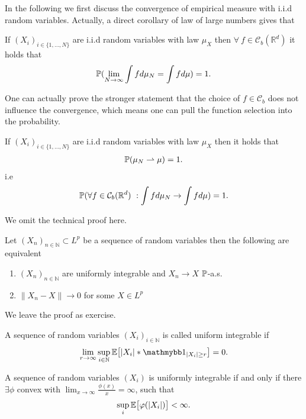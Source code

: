 In the following we first discuss the convergence of empirical measure with i.i.d random variables. 
Actually, a direct corollary of law of large numbers gives that
\begin{prop}
	If  $(X_i)_{i \in  \{1,\ldots ,N\}  }$ are i.i.d random variables with law $\mu_{X}$ then  $\forall  \ f \in  \mathcal{C}_b(\mathbb{R}^{d} ) $ it holds that
	\begin{align*}
	\P(\lim_{N \to \infty} \int  f d \mu_N = \int f d\mu ) = 1
	.\end{align*}
\end{prop}
One can actually prove the stronger statement that the choice of $f \in  \mathcal{C}_b$ does not influence the convergence, which means one can pull the function selection into the probability.
\begin{prop}
	If  $(X_i)_{i \in  \{1,\ldots ,N\}  }$ are i.i.d random variables with law $\mu_{X}$ then  it holds that
	\begin{align*}
	\P(\mu_N \rightharpoonup \mu ) = 1
	.\end{align*}
	i.e 
	\begin{align*}
	\P( \forall  f \in  \mathcal{C}_b(\mathbb{R}^{d} ) \ : \int f d\mu_N \to  \int  f d\mu )  = 1
	.\end{align*}
\end{prop}
We omit the technical proof here.
\newpage
\begin{lemma}\label{general_dct}
	Let $(X_n)_{n \in  \mathbb{N}} \subset   L^{p} $ be a sequence of random variables then the following are equivalent 
	\begin{enumerate}
		\item $(X_n)_{n \in  \mathbb{N}}$ are uniformly integrable  and $X_n \to X$ $\P$-a.s.
		\item $\|X_n - X\| \to  0$ for some $X \in  L^p$
	\end{enumerate}
\end{lemma}
We leave the proof as exercise.
\begin{definition}
A sequence of random variables $(X_i)_{i \in  \mathbb{N}}$ is called uniform integrable if
	\begin{align*}
	\lim_{r \to  \infty} \sup_{i \in  \mathbb{N}} \E\big[\abs{X_i}*\cha_{\abs{X_i}\ge r}\big] = 0
	.\end{align*}
\end{definition}
\begin{lemma}\label{de_la_valle}
	A sequence of random variables $(X_i)$  is uniformly integrable if and only if there 
	$\exists \phi $ convex with
$\lim_{x \to \infty} \frac{\phi(x)}{x} = \infty$, such that
	\begin{align*}
	\sup_i \E\big[\phi(\abs{X_i})\big] < \infty
	.\end{align*}
\end{lemma}
